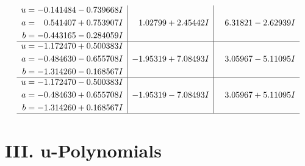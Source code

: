 \documentclass[1p]{elsarticle_modified}
\theoremstyle{definition}
\begin{document}
$$\begin{array}{c|c|c}
\begin{aligned}
u &= -0.141484 - 0.739668 I \\
a &= \phantom{-}0.541407 + 0.753907 I \\
b &= -0.443165 - 0.284059 I\end{aligned}
 & \phantom{-}1.02799 + 2.45442 I & \phantom{-}6.31821 - 2.62939 I \\ \hline\begin{aligned}
u &= -1.172470 + 0.500383 I \\
a &= -0.484630 - 0.655708 I \\
b &= -1.314260 - 0.168567 I\end{aligned}
 & -1.95319 + 7.08493 I & \phantom{-}3.05967 - 5.11095 I \\ \hline\begin{aligned}
u &= -1.172470 - 0.500383 I \\
a &= -0.484630 + 0.655708 I \\
b &= -1.314260 + 0.168567 I\end{aligned}
 & -1.95319 - 7.08493 I & \phantom{-}3.05967 + 5.11095 I\\
 \hline 
 \end{array}$$\newpage
\newpage\renewcommand{\arraystretch}{1}
\centering \section*{ III. u-Polynomials}
\end{document}
